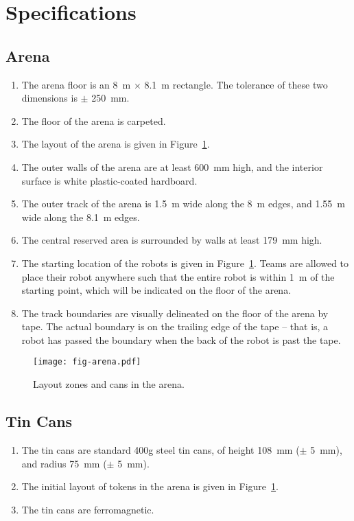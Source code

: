 \section{Specifications}
\label{sec:specs}

\subsection{Arena}
\label{spec:arena}

\begin{enumerate}
  \item The arena floor is an \SI{8}{m} $\times$ \SI{8.1}{m} rectangle. The
        tolerance of these two dimensions is $\pm$ \SI{250}{mm}.
  \item The floor of the arena is carpeted.
  \item The layout of the arena is given in Figure~\ref{fig:arena}.
  \item The outer walls of the arena are at least \SI{600}{mm} high, and the
        interior surface is white plastic-coated hardboard.
  \item The outer track of the arena is \SI{1.5}{m} wide along the \SI{8}{m}
        edges, and \SI{1.55}{m} wide along the \SI{8.1}{m} edges.
  \item The central reserved area is surrounded by walls at least \SI{179}{mm}
        high.
  \item The starting location of the robots is given in Figure~\ref{fig:arena}.
        Teams are allowed to place their robot anywhere such that the entire
        robot is within \SI{1}{m} of the starting point, which will be
        indicated on the floor of the arena.
  \item The track boundaries are visually delineated on the floor of the arena
        by tape. The actual boundary is on the trailing edge of the tape --
        that is, a robot has passed the boundary when the back of the robot
        is past the tape.
\end{enumerate}

\begin{figure}
  \texttt{[image: fig-arena.pdf]}
  \caption{Layout zones and cans in the arena.}
  \label{fig:arena}
\end{figure}

\subsection{Tin Cans}
\label{spec:cans}

\begin{enumerate}
  \item The tin cans are standard 400g steel tin cans, of height \SI{108}{mm}
        ($\pm$ \SI{5}{mm}), and radius \SI{75}{mm} ($\pm$ \SI{5}{mm}).
  \item The initial layout of tokens in the arena is given in
        Figure~\ref{fig:arena}.
  \item The tin cans are ferromagnetic.
\end{enumerate}

